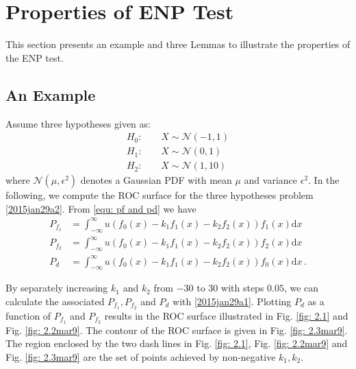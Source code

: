 
\section{Properties of ENP Test}
This section presents an example and three Lemmas to illustrate the properties of the ENP test. 
\subsection{An Example}
Assume three hypotheses given as:
\begin{equation}
  \label{2015jan29a2}
\begin{split}
H_0:\;\;\;\;&X \sim \mathcal{N}(-1, 1)\\
H_1:\;\;\;\;&X \sim \mathcal{N}(0, 1)\\
H_2:\;\;\;\;&X \sim \mathcal{N}(1, 10)
\end{split}
\end{equation}
where $\mathcal{N}(\mu, \epsilon^2)$ denotes a Gaussian PDF with mean $\mu$ and variance $\epsilon^2$. In the following, we compute the ROC surface for the three hypotheses problem \eqref{2015jan29a2}.  
From \eqref{equ: pf and pd} we have  
\begin{equation}
  \begin{split}
	P_{f_1} &= \int_{-\infty}^{\infty}u(f_0(x) - k_1f_1(x) -k_2f_2(x))f_1(x)\mathrm{d}x\\
	P_{f_2} &= \int_{-\infty}^{\infty}u(f_0(x) - k_1f_1(x) -k_2f_2(x))f_2(x)\mathrm{d}x\\
	P_d     &= \int_{-\infty}^{\infty}u(f_0(x) - k_1f_1(x) -k_2f_2(x))f_0(x)\mathrm{d}x\,.
  \end{split}
  \label{2015jan29a1}
\end{equation}

By separately increasing $k_1$ and $k_2$ from $-30$ to $30$ with steps $0.05$, we can calculate the associated $P_{f_1}, P_{f_2}$ and $P_d$ with \eqref{2015jan29a1}. 
Plotting $P_d$ as a function of $P_{f_1}$ and $P_{f_2}$ results in the ROC surface illustrated in Fig. \ref{fig: 2.1} and Fig. \ref{fig: 2.2mar9}. The contour of the ROC surface is given in Fig. \ref{fig: 2.3mar9}. The region enclosed by the two dash lines in Fig. \ref{fig: 2.1}, Fig. \ref{fig: 2.2mar9} and Fig. \ref{fig: 2.3mar9} are the set of points achieved by non-negative $k_1, k_2$.  


